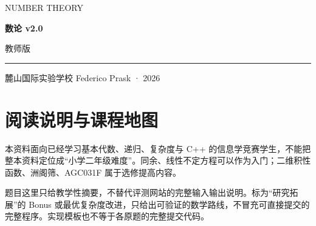 \documentclass[UTF8,a4paper,11pt,twoside,openright,fontset=fandol]{ctexbook}
\theoremstyle{definition}
\newcommand{\docversion}{v2.0}
\begin{document}
\frontmatter
\begin{titlepage}
\setlength{\parindent}{0pt}
\vspace*{1.2cm}
{\large\color{accent}NUMBER THEORY}\par
\vspace{1cm}
{\fontsize{46}{65}\selectfont\bfseries\color{ink}数论 \huge{\docversion}}\par
\vspace{0.5cm}
{\Large 教师版}\par
\vspace{0.5cm}
{\color{accent}\rule{\textwidth}{1.2pt}}\par
\vspace{0.3cm}
\begin{minipage}{0.9\textwidth}
\large 麓山国际实验学校 Federico Prask · 2026
\end{minipage}\par
\vfill
{\normalsize }\par
{\small}
\end{titlepage}
\chapter*{阅读说明与课程地图}

\begin{pitfall}[适用范围与阅读边界]
本资料面向已经学习基本代数、递归、复杂度与 C++ 的信息学竞赛学生，不能把整本资料定位成“小学二年级难度”。同余、线性不定方程可以作为入门；二维积性函数、洲阁筛、AGC031F 属于选修提高内容。

题目这里只给教学性摘要，不替代评测网站的完整输入输出说明。标为“研究拓展”的 Bonus 或最优复杂度改进，只给出可验证的数学路线，不冒充可直接提交的完整程序。实现模板也不等于各原题的完整提交代码。
\end{pitfall}
\end{document}

